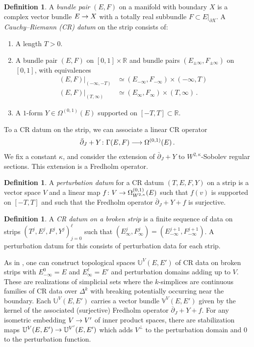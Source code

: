 \documentclass[10pt]{amsart}
\numberwithin{equation}{section}
\theoremstyle{definition}
\newtheorem{definition}[prop]{Definition}
\newcommand{\bR}{\mathbb{R}}
\newcommand{\bU}{\mathbb{U}}
\newcommand{\bV}{\mathbb{V}}
\newcommand{\del}{\partial}
\renewcommand{\to}{\mathchoice{\longrightarrow}{\rightarrow}{}{}}
\begin{document}
	\begin{definition}
			A \emph{bundle pair} $(E,F)$ on a manifold with boundary $X$ is a complex vector bundle $E\to X$ with a totally real subbundle $F\subset E\vert_{\del X}$. A \emph{Cauchy--Riemann (CR) datum} on the strip consists of:
		\begin{enumerate}
			\item A length $T >0 $.
			\item A bundle pair $(E,F)$ on $[0,1]\times \bR$ and bundle pairs $(E_{\pm \infty}, F_{\pm \infty})$ on $[0,1]$, with equivalences
			\begin{align*}
				(E,F)\vert_{(-\infty, -T)} &\simeq (E_{-\infty}, F_{-\infty}) \times (-\infty, T) \\
				(E,F)\vert_{(T,\infty)} &\simeq (E_{\infty},F_{\infty})\times (T,\infty) \,.
			\end{align*}
			\item A $1$-form $Y \in \Omega^{(0,1)}(E)$ supported on $[-T,T] \subset \bR$.
		\end{enumerate}
	\end{definition}
	To a CR datum on the strip, we can associate a linear CR operator
	\begin{align}\label{eq:cr-operator}
		\bar{\del}_{J} + Y \colon \Gamma(E,F) \to \Omega^{(0,1)}(E) \,.
	\end{align}
	We fix a constant $\kappa$, and consider the extension of $\bar{\del}_{J} + Y$ to $W^{2,\kappa}$-Sobolev regular sections.
  This extension is a Fredholm operator.
	\begin{definition}
		A \emph{perturbation datum} for a CR datum $(T,E,F,Y)$ on a strip is a vector space $V$ and a linear map $f\colon V \to \Omega_{W^{2,\kappa}}^{(0,1)}(E)$ such that $f(v)$ is supported on $[-T,T]$ and such that the Fredholm operator $\overline{\del}_{J}+Y+f$ is surjective.
	\end{definition}
	\begin{definition}
			A \emph{CR datum on a broken strip} is a finite sequence of data on strips $(T^{j},E^{j},F^{j}, Y^{j})_{j=0}^{\ell}$ such that $(E^{j}_{\infty},F^{j}_{\infty})=(E^{j+1}_{-\infty}, F^{j+1}_{-\infty})$.
      A perturbation datum for this consists of perturbation data for each strip.
	\end{definition}




	As in \cite{porcelli2024spectral}, one can construct topological spaces $\bU^{V}(E,E')$ of CR data on broken strips with $E^{0}_{-\infty}=E$ and $E^{\ell}_{\infty}=E'$ and perturbation domains adding up to $V$.
  These are realizations of simplicial sets where the $k$-simplices are continuous families of CR data over $\Delta^{k}$ with breaking potentially occurring near the boundary.
  Each $\bU^{V}(E,E')$ carries a vector bundle $\bV^{V}(E,E')$ given by the kernel of the associated (surjective) Fredholm operator $\overline{\del}_{J}+Y+f$.
  For any isometric embedding $V\to V'$ of inner product spaces, there are stabilization maps $\bU^{V}(E,E') \to \bU^{V'}(E,E')$ which adds $V^{\perp}$ to the perturbation domain and 0 to the perturbation function.
\end{document}
